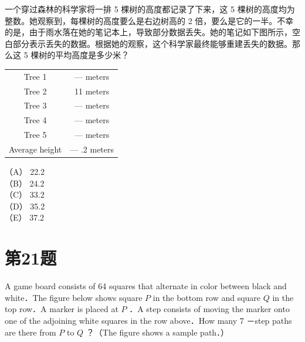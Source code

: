 \documentclass[10pt]{article}
\begin{document}
一个穿过森林的科学家将一排 5 棵树的高度都记录了下来，这 5 棵树的高度均为整数。她观察到，每棵树的高度要么是右边树高的 2 倍，要么是它的一半。不幸的是，由于雨水落在她的笔记本上，导致部分数据丢失。她的笔记如下图所示，空白部分表示丢失的数据。根据她的观察，这个科学家最终能够重建丢失的数据。那么这 5 棵树的平均高度是多少米？

\begin{center}
\begin{tabular}{|c|c|}
\hline
Tree 1 & — meters \\
Tree 2 & 11 meters \\
Tree 3 & — meters \\
Tree 4 & — meters \\
Tree 5 & — meters \\
\hline
Average height & — .2 meters \\
\hline
\end{tabular}
\end{center}

（A） 22.2\\
（B） 24.2\\
（C） 33.2\\
（D） 35.2\\
（E） 37.2

\section*{第21题}
A game board consists of 64 squares that alternate in color between black and white．The figure below shows square $P$ in the bottom row and square $Q$ in the top row．A marker is placed at $P$ ．A step consists of moving the marker onto one of the adjoining white squares in the row above．How many 7 －step paths are there from $P$ to $Q$ ？（The figure shows a sample path．）
\end{document}
